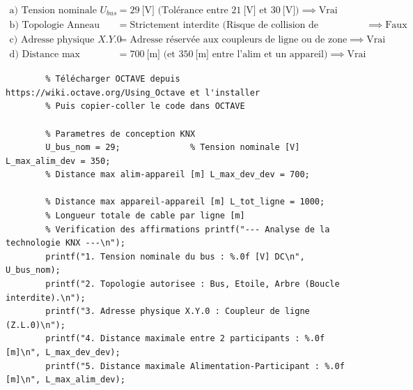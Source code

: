 \documentclass[a4paper,11pt,answers,addpoints]{exam}
\begin{document}
\begin{questions}
\vspace{0.5em}
\begin{solution} 
	\begin{align*} 
		\text{a) Tension nominale } U_{bus} &= \qty{29}{[\volt]} \text{ (Tolérance entre } \qty{21}{[\volt]} \text{ et } \qty{30}{[\volt]} \text{)} \implies \text{Vrai} \\[6pt]
		 \text{b) Topologie Anneau} &= \text{Strictement interdite (Risque de collision de télégrammes)} \implies \text{Faux} \\[6pt]
		 \text{c) Adresse physique } X.Y.0 &= \text{Adresse réservée aux coupleurs de ligne ou de zone} \implies \text{Vrai} \\[6pt] 
		 \text{d) Distance max (Appareil-Appareil)} &= \qty{700}{[\meter]} \text{ (et } \qty{350}{[\meter]} \text{ entre l'alim et un appareil)} \implies \text{Vrai}
	\end{align*}
	\begin{verbatim} 
		% Télécharger OCTAVE depuis https://wiki.octave.org/Using_Octave et l'installer 
		% Puis copier-coller le code dans OCTAVE
		
		% Parametres de conception KNX 
		U_bus_nom = 29;              % Tension nominale [V] L_max_alim_dev = 350;
		% Distance max alim-appareil [m] L_max_dev_dev = 700;         
		
		% Distance max appareil-appareil [m] L_tot_ligne = 1000;          
		% Longueur totale de cable par ligne [m]
		% Verification des affirmations printf("--- Analyse de la technologie KNX ---\n"); 
		printf("1. Tension nominale du bus : %.0f [V] DC\n", U_bus_nom); 
		printf("2. Topologie autorisee : Bus, Etoile, Arbre (Boucle interdite).\n"); 
		printf("3. Adresse physique X.Y.0 : Coupleur de ligne (Z.L.0)\n"); 
		printf("4. Distance maximale entre 2 participants : %.0f [m]\n", L_max_dev_dev); 
		printf("5. Distance maximale Alimentation-Participant : %.0f [m]\n", L_max_alim_dev); 
	\end{verbatim}
	\end{solution}
	
\end{questions}
\end{document}
